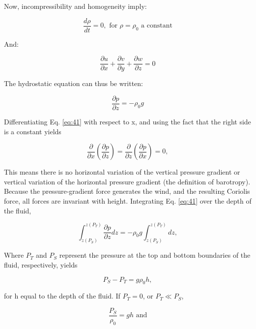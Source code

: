 \documentclass{article}
\begin{document}
Now,  incompressibility and homogeneity imply:

\begin{equation}
\frac{d\rho}{dt} = 0, \text{ for } \rho = \rho_0 \text{ a constant}
\label{eq:39}
\end{equation}

And:

\begin{equation}
\frac{\partial u}{\partial x} + \frac{\partial v}{\partial y} + \frac{\partial w}{\partial z} = 0
\label{eq:40}
\end{equation}

The hydrostatic equation can thus be written:

\begin{equation}
\frac{\partial p}{\partial z} = -\rho_0 g
\label{eq:41}
\end{equation}

Differentiating Eq. \ref{eq:41} with respect to x, and using the fact that the right side is a constant yields

\begin{equation}
\frac{\partial}{\partial x}\left(\frac{\partial p}{\partial z}\right) = \frac{\partial}{\partial z}\left(\frac{\partial p}{\partial x}\right) = 0,
\label{eq:42}
\end{equation}

This means there is no horizontal variation of the vertical pressure gradient or vertical variation of the horizontal pressure gradient (the definition of barotropy). Because the pressure-gradient force generates the wind, and the resulting Coriolis force, all forces are invariant with height. Integrating Eq. \ref{eq:41} over the depth of the fluid,

\begin{equation}
\int_{z(P_S)}^{z(P_T)} \frac{\partial p}{\partial z}dz = -\rho_0g \int_{z(P_S)}^{z(P_T)} dz,
\label{eq:43}
\end{equation}

Where $P_T$ and $P_S$ represent the pressure at the top and bottom boundaries of the fluid, respectively, yields

\begin{equation}
P_S - P_T = g\rho_0h,
\label{eq:44}
\end{equation}

for h equal to the depth of the fluid. If $P_T = 0$, or $P_T \ll P_S$,

\begin{equation}
\frac{P_S}{\rho_0} = gh \text{ and}
\label{eq:45}
\end{equation}
\end{document}
